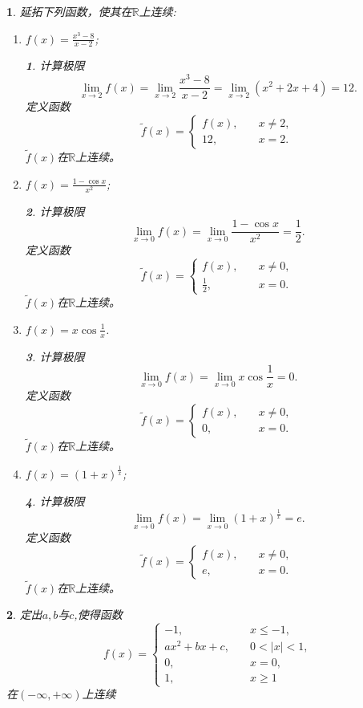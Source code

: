 \documentclass[utf8]{book}
\newtheorem{example}{}[section]             %
\newtheorem{solution}{}
\begin{document}
\begin{example}延拓下列函数，使其在$\mathbb{R}$上连续:
\renewcommand\labelenumi{\normalfont(\theenumi)}
\begin{enumerate}
\item $f(x)=\frac{x^3-8}{x-2}$;
\begin{solution}计算极限
$$\displaystyle\lim_{x\to 2}f(x)=\displaystyle\lim_{x\to 2}\frac{x^3-8}{x-2}=\displaystyle\lim_{x\to 2}(x^2+2x+4)=12.$$
定义函数 $$\tilde{f}(x)=
\begin{cases}
f(x),\quad&x\neq 2,\\
12,\quad&x=2.
\end{cases}$$
$\tilde{f}(x)$在$\mathbb{R}$上连续。
\end{solution}
\item $f(x)=\displaystyle\frac{1-\cos{x}}{x^2}$;
\begin{solution}计算极限
$$\displaystyle\lim_{x\to 0}f(x)=\displaystyle\lim_{x\to 0}\frac{1-\cos{x}}{x^2}=\frac{1}{2}.$$
定义函数
$$
\tilde{f}(x)=
\begin{cases}
f(x),\quad&x\neq 0,\\
\frac{1}{2},\quad&x=0.
\end{cases}
$$
$\tilde{f}(x)$在$\mathbb{R}$上连续。
\end{solution}
\item $f(x)=x\cos{\frac{1}{x}}$.
\begin{solution}计算极限
$$\displaystyle\lim_{x\to 0}f(x)=\displaystyle\lim_{x\to 0}x\cos{\frac{1}{x}}=0.$$
定义函数
$$
\tilde{f}(x)=
\begin{cases}
f(x),\quad&x\neq 0,\\
0,\quad&x=0.
\end{cases}
$$
$\tilde{f}(x)$在$\mathbb{R}$上连续。
\end{solution}
\item $f(x)=(1+x)^{\frac{1}{x}}$;
\begin{solution}计算极限
$$\displaystyle\lim_{x\to 0}f(x)=\displaystyle\lim_{x\to 0}(1+x)^{\frac{1}{x}}=e.$$
定义函数
$$
\tilde{f}(x)=
\begin{cases}
f(x),\quad&x\neq 0,\\
e,\quad&x=0.
\end{cases}
$$
$\tilde{f}(x)$在$\mathbb{R}$上连续。
\end{solution}
\end{enumerate}
\end{example}
\begin{example}定出$a,b$与$c$,使得函数
$$f(x)=
\begin{cases}
-1,\quad&x\leq -1,\\
ax^2+bx+c,\quad&0<|x|<1,\\
0,\quad&x=0,\\
1,\quad&x\geq1
\end{cases}$$
在$(-\infty,+\infty)$上连续
\end{example}
\end{document}
